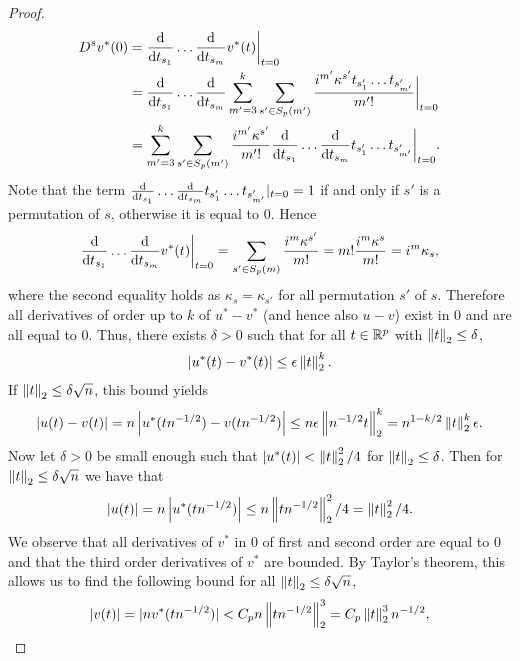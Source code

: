 \begin{proof}
    \begin{align*}
        D^s v^*(0)
        &= \frac{\text{d}}{\text{d} t_{s_1}}\ldots\frac{\text{d}}{\text{d} t_{s_m}} v^*(t) \bigg|_{t=0}\\
        &= \frac{\text{d}}{\text{d} t_{s_1}}\ldots\frac{\text{d}}{\text{d} t_{s_m}} \sum_{m'=3}^k \sum_{s' \in S_p(m')} \frac{i^{m'}\kappa^{s'}t_{s'_1}\ldots t_{s'_{m'}}}{m'!} \bigg|_{t=0} \\
        &= \sum_{m'=3}^k \sum_{s' \in S_p(m')} \frac{i^{m'}\kappa^{s'}}{m'!} \frac{\text{d}}{\text{d} t_{s_1}}\ldots\frac{\text{d}}{\text{d} t_{s_m}}t_{s'_1}\ldots t_{s'_{m'}} \bigg|_{t=0}.
    \end{align*}
    Note that the term $\frac{\text{d}}{\text{d} t_{s_1}}\ldots\frac{\text{d}}{\text{d} t_{s_m}}t_{s'_1}\ldots t_{s'_{m'}} |_{t=0} = 1$ if and only if $s'$ is a permutation of $s$, otherwise it is equal to 0. Hence
    \begin{equation*}
        \frac{\text{d}}{\text{d} t_{s_1}}\ldots\frac{\text{d}}{\text{d} t_{s_m}} v^*(t) \bigg|_{t=0} 
        = \sum_{s' \in S_p(m)} \frac{i^m\kappa^{s'}}{m!}
        = m! \frac{i^m\kappa^{s}}{m!}
        = i^m\kappa_s,
    \end{equation*}
    where the second equality holds as $\kappa_s = \kappa_{s'}$ for all permutation $s'$ of $s$. Therefore all derivatives of order up to $k$ of $u^* - v^*$ (and hence also $u - v$) exist in 0 and are all equal to 0. Thus, there exists $\delta > 0$ such that for all $t \in {\mathbb{R}^p}$ with $\left\lVert t\right\rVert_2 \leq \delta$,
    \begin{equation*}
        \left|u^*(t) - v^*(t)\right| \leq \epsilon\left\lVert t\right\rVert_2^k.
    \end{equation*}
    If $\left\lVert t\right\rVert_2 \leq \delta \sqrt{n}$, this bound yields
    \begin{equation*}
        \left|u(t) - v(t)\right| = n\left|u^*(t n^{-1/2}) - v(t n^{-1/2})\right| \leq n\epsilon\left\lVert n^{-1/2}t\right\rVert_2^k = n^{1-k/2}\left\lVert t\right\rVert_2^k\epsilon.
    \end{equation*}
    Now let $\delta > 0$ be small enough such that $\left|u^*(t)\right| < \left\lVert t\right\rVert_2^2/4$ for $\left\lVert t\right\rVert_2 \leq \delta$. Then for $\left\lVert t\right\rVert_2 \leq \delta\sqrt{n}$ we have that
    \begin{equation*}
        \left|u(t)\right| = n\left|u^*(t n^{-1/2})\right| \leq n \left\lVert t n^{-1/2}\right\rVert_2^2/4 = \left\lVert t\right\rVert_2^2/4.
    \end{equation*}
    We observe that all derivatives of $v^*$ in 0 of first and second order are equal to 0 and that the third order derivatives of $v^*$ are bounded. By Taylor's theorem, this allows us to find the following bound for all $\left\lVert t\right\rVert_2 \leq \delta \sqrt{n}$,
    \begin{equation*}
        |v(t)| = |nv^*(t n^{-1/2})| < C_p n \norm{t n^{-1/2}}_2^3 = C_p \norm{t}_2^3 n^{-1/2},

\end{equation*}
\end{proof}
